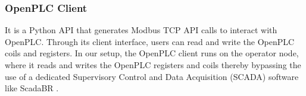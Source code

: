     \subsubsection{OpenPLC Client} It is a Python API that generates Modbus TCP API calls to interact with OpenPLC. Through its client interface, users can read and write the OpenPLC coils and registers. In our setup, the OpenPLC client runs on the operator node, where it reads and writes the OpenPLC registers and coils thereby
    bypassing the use of a dedicated Supervisory Control and Data Acquisition (SCADA) software like ScadaBR \cite{6938840}.
    
    












